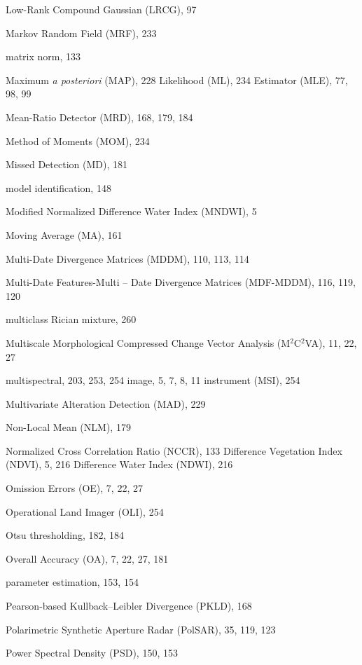 \documentclass[fleqn,treatise,allpages]{ISTE_Science}
\begin{document}
\begin{theindex}
  \item Low-Rank Compound Gaussian (LRCG), 97
  \item Markov Random Field (MRF), 233
  \item matrix norm, 133
  \item Maximum
  \subitem \textit{a posteriori} (MAP), 228
  \subitem Likelihood (ML), 234
  \subsubitem Estimator (MLE), 77, 98, 99
  \item Mean-Ratio Detector (MRD), 168, 179, 184
  \item Method of Moments (MOM), 234
  \item Missed Detection (MD), 181
  \item model identification, 148
  \item Modified Normalized Difference Water Index (MNDWI), 5
  \item Moving Average (MA), 161
    \item Multi-Date Divergence Matrices (MDDM), 110, 113, 114
  \item Multi-Date Features-Multi -- Date Divergence Matrices (MDF-MDDM),
		116, 119, 120
  \item multiclass Rician mixture, 260
      \item Multiscale Morphological Compressed Change Vector Analysis (M$^{2}$C$^{2}$VA),
		11, 22, 27
  \item multispectral, 203, 253, 254
 \subitem image, 5, 7, 8, 11
  \subitem instrument (MSI), 254
    \item Multivariate Alteration Detection (MAD), 229
  \item Non-Local Mean (NLM), 179
  \item Normalized
  \subitem Cross Correlation Ratio (NCCR), 133
  \subitem Difference Vegetation Index (NDVI), 5, 216
  \subitem Difference Water Index (NDWI), 216
  \item Omission Errors (OE), 7, 22, 27
  \item Operational Land Imager (OLI), 254
  \item Otsu thresholding, 182, 184
  \item Overall Accuracy (OA), 7, 22, 27, 181
    \item parameter estimation, 153, 154
  \item Pearson-based Kullback--Leibler Divergence (PKLD), 168
  \item Polarimetric Synthetic Aperture Radar (PolSAR), 35, 119, 123
  \item Power Spectral Density (PSD), 150, 153

\end{theindex}
\end{document}
